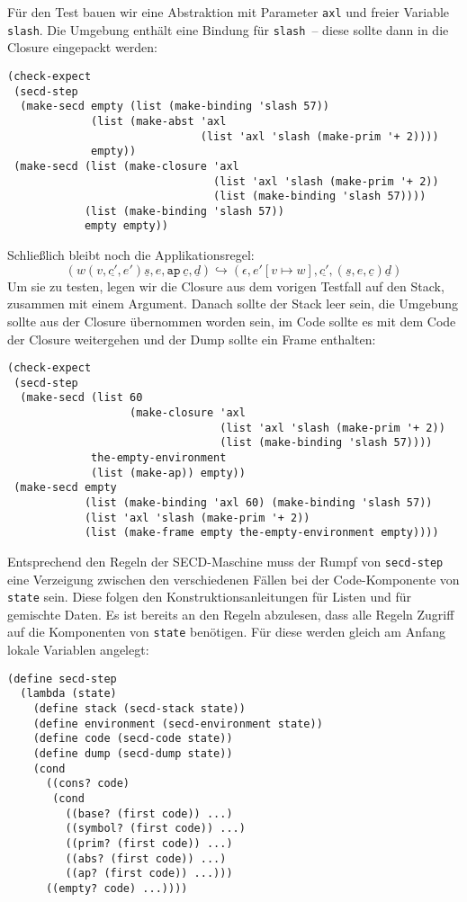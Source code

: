 %
Für den Test bauen wir eine Abstraktion mit Parameter \lstinline{axl}
und freier Variable \lstinline{slash}.  Die Umgebung enthält 
eine Bindung für \lstinline{slash}~-- diese sollte dann in die Closure
eingepackt werden:
%
\begin{lstlisting}
(check-expect
 (secd-step
  (make-secd empty (list (make-binding 'slash 57))
             (list (make-abst 'axl 
                              (list 'axl 'slash (make-prim '+ 2))))
             empty))
 (make-secd (list (make-closure 'axl
                                (list 'axl 'slash (make-prim '+ 2))
                                (list (make-binding 'slash 57))))
            (list (make-binding 'slash 57))
            empty empty))
\end{lstlisting}
%
Schließlich bleibt noch die Applikationsregel:
%
\begin{displaymath}
  (w (v,\underline{c'}, e') \underline{s}, e, \mathtt{ap}~\underline{c}, \underline{d})
  \hookrightarrow
  (\epsilon, e'[v\mapsto w], \underline{c'}, (\underline{s}, e, \underline{c}) \underline{d})
\end{displaymath}
%
Um sie zu testen, legen wir die Closure aus dem vorigen Testfall auf
den Stack, zusammen mit einem Argument.  Danach sollte der Stack leer
sein, die Umgebung sollte aus der Closure übernommen worden sein, im
Code sollte es mit dem Code der Closure weitergehen und der Dump
sollte ein Frame enthalten:
%
\begin{lstlisting}
(check-expect
 (secd-step
  (make-secd (list 60
                   (make-closure 'axl
                                 (list 'axl 'slash (make-prim '+ 2))
                                 (list (make-binding 'slash 57))))
             the-empty-environment
             (list (make-ap)) empty))
 (make-secd empty
            (list (make-binding 'axl 60) (make-binding 'slash 57))
            (list 'axl 'slash (make-prim '+ 2))
            (list (make-frame empty the-empty-environment empty))))
\end{lstlisting}
%
Entsprechend den Regeln der SECD-Maschine muss der Rumpf von
\lstinline{secd-step}
eine Verzeigung zwischen den verschiedenen Fällen bei der
Code-Komponente von \lstinline{state} sein.  Diese folgen den
Konstruktionsanleitungen für Listen und für gemischte Daten.  Es ist
bereits an den Regeln abzulesen, dass alle Regeln Zugriff auf die
Komponenten von \lstinline{state} benötigen.  Für diese werden gleich am
Anfang lokale Variablen angelegt:
%
\begin{lstlisting}
(define secd-step
  (lambda (state)
    (define stack (secd-stack state))
    (define environment (secd-environment state))
    (define code (secd-code state))
    (define dump (secd-dump state))
    (cond
      ((cons? code)
       (cond
         ((base? (first code)) ...)
         ((symbol? (first code)) ...)
         ((prim? (first code)) ...)
         ((abs? (first code)) ...)
         ((ap? (first code)) ...)))
      ((empty? code) ...))))
\end{lstlisting}
